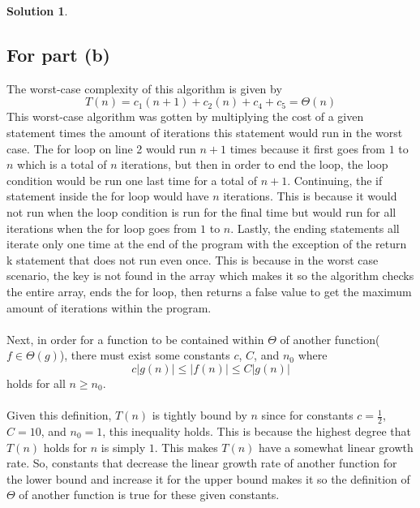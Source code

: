 \documentclass{article}
\theoremstyle{definition}
\newtheorem*{solution}{Solution}
\begin{document}
\begin{solution}
\hspace{1cm}
\subsection*{For part (b)}
The worst-case complexity of this algorithm is given by\\
$$ T(n) = c_1(n+1) + c_2(n) + c_4 + c_5 = \Theta(n) $$
This worst-case algorithm was gotten by multiplying the cost of a given statement times the amount of iterations this statement would run in the worst case. The for loop on line 2 would run $n+1$ times because it first goes from $1$ to $n$ which is a total of $n$ iterations, but then in order to end the loop, the loop condition would be run one last time for a total of $n+1$. Continuing, the if statement inside the for loop would have $n$ iterations. This is because it would not run when the loop condition is run for the final time but would run for all iterations when the for loop goes from $1$ to $n$. Lastly, the ending statements all iterate only one time at the end of the program with the exception of the return k statement that does not run even once. This is because in the worst case scenario, the key is not found in the array which makes it so the algorithm checks the entire array, ends the for loop, then returns a false value to get the maximum amount of iterations within the program.
\\\\Next, in order for a function to be contained within $\Theta$ of another function($f \in \Theta(g)$), there must exist some constants $c$, $C$, and $n_0$ where
$$ c|g(n)| \leqslant |f(n)| \leqslant C|g(n)| $$
holds for all $n \geqslant n_0$.\\\\
Given this definition, $T(n)$ is tightly bound by $n$ since for constants $c = \frac{1}{2}$, $C = 10$, and $n_0 = 1$, this inequality holds. This is because the highest degree that $T(n)$ holds for $n$ is simply $1$. This makes $T(n)$ have a somewhat linear growth rate. So, constants that decrease the linear growth rate of another function for the lower bound and increase it for the upper bound makes it so the definition of $\Theta$ of another function is true for these given constants.
\end{solution}
\end{document}
